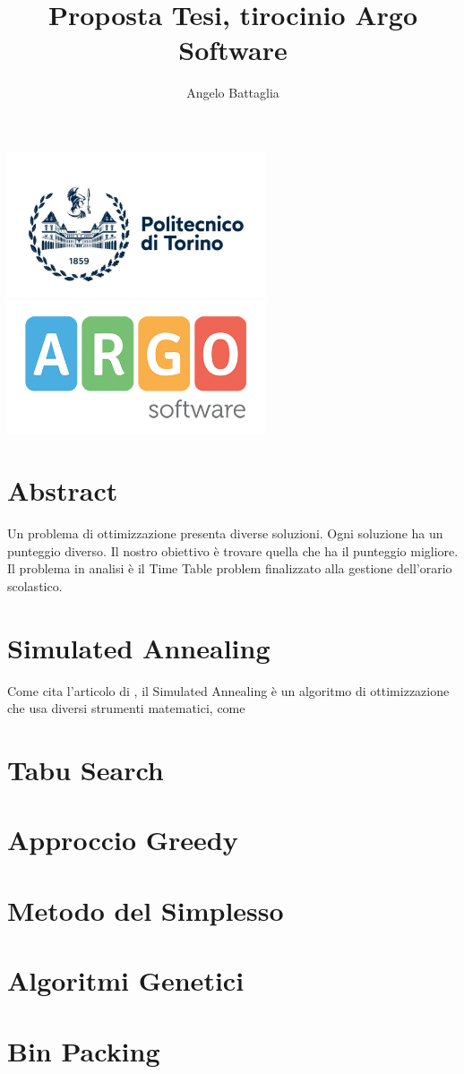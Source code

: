 \documentclass{article}
\author{Angelo Battaglia}
\title{Proposta Tesi, tirocinio Argo Software}
\begin{document}
\maketitle

\begin{center}
\includegraphics[width=3in]{polito.jpg}
\includegraphics[width=3in]{og_logoargosoft.png}
\end{center}

\section{Abstract}

Un problema di ottimizzazione presenta diverse soluzioni. Ogni soluzione
ha un punteggio diverso. Il nostro obiettivo è trovare quella che ha il punteggio
migliore. Il problema in analisi è il Time Table problem finalizzato alla 
gestione dell'orario scolastico.

\section{Simulated Annealing}

Come cita l'articolo di  \textcite{SimulatedAnnealing01}, il Simulated Annealing
è un algoritmo di ottimizzazione che usa diversi strumenti matematici, come  

\section{Tabu Search}

\section{Approccio Greedy}

\section{Metodo del Simplesso}

\section{Algoritmi Genetici}

\section{Bin Packing}

\printbibliography
\end{document}
